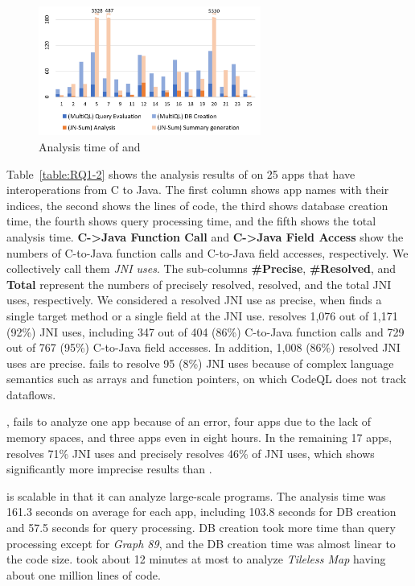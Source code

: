 \begin{figure}
  \centering
  \vspace{2mm}
  \includegraphics[width=0.65\textwidth]{img/graph}
  \vspace*{-.5em}
  \caption{Analysis time of \ours and \lees}
  \label{fig:graph}
\vspace*{-1em}
\end{figure}

Table~\ref{table:RQ1-2} shows the analysis results of \ours on 25 apps that have
interoperations from C to Java.
The first column shows app names with their indices, the second shows the lines of code,
the third shows database creation time, the
fourth shows query processing time, and the fifth shows the total analysis time.
{\bf C->Java Function Call} and {\bf C->Java Field Access} show the numbers of
C-to-Java function calls and C-to-Java field accesses, respectively. We
collectively call them \emph{JNI uses}.
The sub-columns {\bf \#Precise}, {\bf \#Resolved}, and {\bf Total} represent
the numbers of precisely resolved, resolved, and the total JNI uses,
respectively.
We considered a resolved JNI use as precise, when \ours finds a single target
method or a single field at the JNI use.
\ours resolves 1,076 out of 1,171 (92\%) JNI uses, including 347 out of 404
(86\%) C-to-Java function calls and 729 out of 767 (95\%) C-to-Java field
accesses. 
In addition, 1,008 (86\%) resolved JNI uses are precise.
\ours fails to resolve 95 (8\%) JNI uses because of complex language semantics
such as arrays and function pointers, on which
CodeQL does not track dataflows.

,
\lees fails to analyze one app because of an error, four apps due to the lack
of memory spaces, and three apps even in eight hours.  
In the remaining 17 apps, \lees resolves 71\% JNI uses
and precisely resolves 46\% of JNI uses,
which shows significantly more imprecise results than \ours.

\ours is scalable in that it can analyze large-scale programs. 
The analysis time was 161.3 seconds on average for each app, including 103.8
seconds for DB creation and 57.5 seconds for query processing.  
DB creation took more time than query processing except for {\it Graph 89}, and
the DB creation time was almost linear to the code size. 
\ours took about 12 minutes at most to analyze {\it Tileless Map} having about
one million lines of code.

